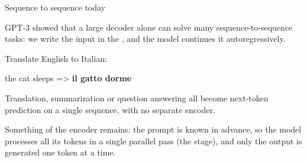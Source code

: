 \begin{frame}{Sequence to sequence today}
    \setlength{\parskip}{6pt}

    GPT-3 showed that a large decoder alone can solve many sequence-to-sequence
    tasks: we write the input in the , and the model continues it
    autoregressively.

    \begin{tcolorbox}[nndsblue]
        \ttfamily\small Translate English to Italian:\par
        the cat sleeps => {\color{darkgreen}\bfseries il gatto dorme}
    \end{tcolorbox}

    Translation, summarization or question answering all become next-token
    prediction on a single sequence, with no separate encoder.

    Something of the encoder remains: the prompt is known in advance, so the
    model processes all its tokens in a single parallel pass (the
     stage), and only the output is
    generated one token at a time.


\end{frame}

\subsection{}

